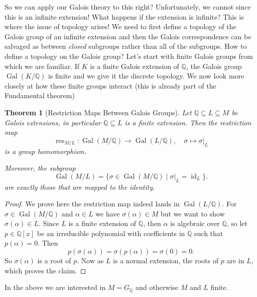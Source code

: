 \documentclass{article}
\newtheorem{theorem}{Theorem}[section]
\theoremstyle{definition}
\theoremstyle{definition}
\theoremstyle{definition}
\newcommand{\Gal}{\operatorname{Gal}}
\newcommand{\Q}{\mathbb{Q}}
\begin{document}
So we can apply our Galois theory to this right? Unfortunately, we cannot since this is an infinite extension! What happens if the extension is infinite? This is where the issue of topology arises! We need to first define a topology of the Galois group of an infinite extension and then the Galois correspondence can be salvaged as between \emph{closed} subgroups rather than all of the subgroups.
\newline\newline
How to define a topology on the Galois group?
\newline\newline
Let's start with finite Galois groups from which we are familiar. If $K$ is a finite Galois extension of $\Q$, the Galois group $\Gal(K/\Q)$ is finite and we give it the discrete topology.
\newline\newline
We now look more closely at how these finite groups interact (this is already part of the Fundamental theorem)

\begin{theorem}[Restriction Maps Between Galois Groups]
Let $\Q \subseteq L \subseteq M$ be Galois extensions, in particular $\Q\subseteq L$ is a finite extension. Then the restriction map
\[
\operatorname{res}_{M/L} : \operatorname{Gal}(M/\Q) \longrightarrow \operatorname{Gal}(L/\Q),
\quad \sigma \mapsto \sigma|_L
\]
is a group homomorphism.

Moreover, the subgroup
\[
\operatorname{Gal}(M/L) = \{ \sigma \in \operatorname{Gal}(M/\Q) \mid \sigma|_L = \operatorname{id}_L \}.
\]
are exactly those that are mapped to the identity.
\end{theorem}

\begin{proof}
    We prove here the restriction map indeed lands in $\Gal(L/\Q)$. For $\sigma\in\Gal(M/\Q)$ and $\alpha\in L$ we have $\sigma(\alpha)\in M$ but we want to show $\sigma(\alpha)\in L$. Since $L$ is a finite extension of $\Q$, then $\alpha$ is algebraic over $\Q$, so let $p\in \Q[x]$ be an irreducible polynomial with coefficients in $\Q$ such that $p(\alpha)=0$. Then $$p(\sigma(\alpha))=\sigma(p(\alpha))=\sigma(0)=0.$$
    So $\sigma(\alpha)$ is a root of $p$. Now as $L$ is a normal extension, the roots of $p$ are in $L$, which proves the claim.
\end{proof}

In the above we are interested in $M=G_\Q$ and otherwise $M$ and $L$  finite. 
\end{document}
